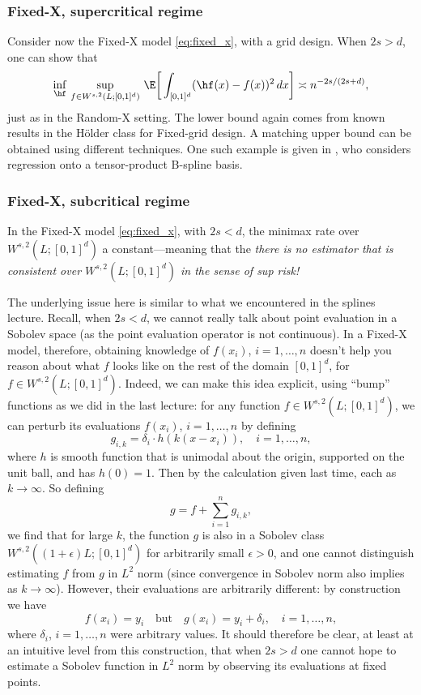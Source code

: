 \documentclass{article}
\begin{document}
\subsubsection{Fixed-X, supercritical regime}

Consider now the Fixed-X model \eqref{eq:fixed_x}, with a grid design. When $2s
> d$, one can show that
\[
\inf_{\hf} \, \sup_{f \in W^{s,2}(L; [0,1]^d)} \, \E \bigg[ \int_{[0,1]^d}
(\hf(x) - f(x))^2 \, dx \bigg] \asymp n^{-2s/(2s+d)},
\]
just as in the Random-X setting. The lower bound again comes from known results
in the H{\"o}lder class for Fixed-grid design. A matching upper bound can be
obtained using different techniques. One such example is given in
\citet{nussbaum1987nonparametric}, who considers regression onto a
tensor-product B-spline basis.   

\subsubsection{Fixed-X, subcritical regime}

In the Fixed-X model \eqref{eq:fixed_x}, with $2s < d$, the minimax rate over
$W^{s,2}(L; [0,1]^d)$ a constant---meaning that the \emph{there is no estimator
  that is consistent over $W^{s,2}(L; [0,1]^d)$ in the sense of sup risk!} 

The underlying issue here is similar to what we encountered in the splines
lecture. Recall, when $2s < d$, we cannot really talk about point evaluation in
a Sobolev space (as the point evaluation operator is not continuous). In a
Fixed-X model, therefore, obtaining knowledge of $f(x_i)$, $i=1,\dots,n$ doesn't 
help you reason about what $f$ looks like on the rest of the domain $[0,1]^d$,
for $f \in W^{s,2}(L; [0,1]^d)$. Indeed, we can make this idea explicit, using
``bump'' functions as we did in the last lecture: for any function $f \in
W^{s,2}(L; [0,1]^d)$, we can perturb its evaluations $f(x_i)$, $i=1,\dots,n$ by
defining     
\[
g_{i,k} = \delta_i \cdot h(k(x-x_i)), \quad i=1,\dots,n, 
\]
where $h$ is smooth function that is unimodal about the origin, supported on
the unit ball, and has $h(0) = 1$. Then by the calculation given last time, each 
 as $k \to \infty$. So defining
\[
g = f + \sum_{i=1}^n g_{i,k},
\]
we find that for large $k$, the function $g$ is also in a Sobolev class
$W^{s,2}((1+\epsilon) L; [0,1]^d)$ for arbitrarily small $\epsilon>0$, and one
cannot distinguish estimating $f$ from $g$ in $L^2$ norm (since convergence in 
Sobolev norm also implies  as $k \to 
\infty$). However, their evaluations are arbitrarily different: by construction
we have 
\[
f(x_i) = y_i \quad \text{but} \quad g(x_i) = y_i + \delta_i, \quad i =
1,\dots,n, 
\]
where $\delta_i$, $i=1,\dots,n$ were arbitrary values. It should therefore be
clear, at least at an intuitive level from this construction, that when $2s > d$
one cannot hope to estimate a Sobolev function in $L^2$ norm by observing 
its evaluations at fixed points.     
\end{document}
